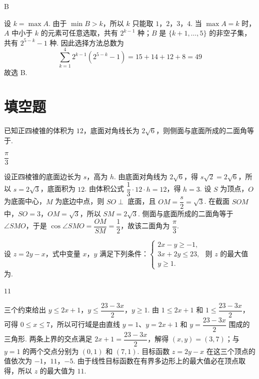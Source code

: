 \begin{answer}
B
\end{answer}

\begin{solution}
设 \(k=\max A\). 由于 \(\min B>k\)，所以 \(k\) 只能取 \(1\)，\(2\)，\(3\)，\(4\). 当 \(\max A=k\) 时，\(A\) 中小于 \(k\) 的元素可任意选取，共有 \(2^{k-1}\) 种；\(B\) 是 \(\{k+1,\ldots,5\}\) 的非空子集，共有 \(2^{5-k}-1\) 种. 因此选择方法总数为
\[
\sum_{k=1}^{4}2^{k-1}\left(2^{5-k}-1\right)=15+14+12+8=49
\]
故选 B.
\end{solution}

\section{填空题}

\begin{problem}
已知正四棱锥的体积为 \(12\)，底面对角线长为 \(2\sqrt6\)，则侧面与底面所成的二面角等于\fillinblank{}.
\end{problem}

\begin{answer}
\(\dfrac{\pi}{3}\)
\end{answer}

\begin{solution}
设正四棱锥的底面边长为 \(s\)，高为 \(h\). 由底面对角线为 \(2\sqrt6\)，得 \(s\sqrt2=2\sqrt6\)，所以 \(s=2\sqrt3\)，底面积为 \(12\). 由体积公式 \(\dfrac13\cdot12\cdot h=12\)，得 \(h=3\). 设 \(S\) 为顶点，\(O\) 为底面中心，\(M\) 为底边中点，则 \(SO\perp\) 底面，且 \(OM=\dfrac{s}{2}=\sqrt3\). 在截面 \(SOM\) 中，\(SO=3\)，\(OM=\sqrt3\)，所以 \(SM=2\sqrt3\). 侧面与底面所成的二面角等于 \(\angle SMO\)，于是 \(\cos\angle SMO=\dfrac{OM}{SM}=\dfrac12\)，故该二面角为 \(\dfrac{\pi}{3}\).
\end{solution}

\begin{problem}
设 \(z=2y-x\)，式中变量 \(x\)，\(y\) 满足下列条件：\(\begin{cases}
2x-y\geqslant-1,\\
3x+2y\leqslant23,\\
y\geqslant1.
\end{cases}\) 则 \(z\) 的最大值为\fillinblank{}.
\end{problem}

\begin{answer}
\(11\)
\end{answer}

\begin{solution}
三个约束给出 \(y\leq2x+1\)，\(y\leq\dfrac{23-3x}{2}\)，\(y\geq1\). 由 \(1\leq2x+1\) 和 \(1\leq\dfrac{23-3x}{2}\)，可得 \(0\leq x\leq7\)，所以可行域是由直线 \(y=1\)、\(y=2x+1\) 和 \(y=\dfrac{23-3x}{2}\) 围成的三角形. 两条上界的交点满足 \(2x+1=\dfrac{23-3x}{2}\)，解得 \((x,y)=(3,7)\)；与 \(y=1\) 的两个交点分别为 \((0,1)\) 和 \((7,1)\). 目标函数 \(z=2y-x\) 在这三个顶点的值依次为 \(-1\)，\(11\)，\(-5\). 由于线性目标函数在有界多边形上的最大值必在顶点取得，所以 \(z\) 的最大值为 \(11\).
\end{solution}

